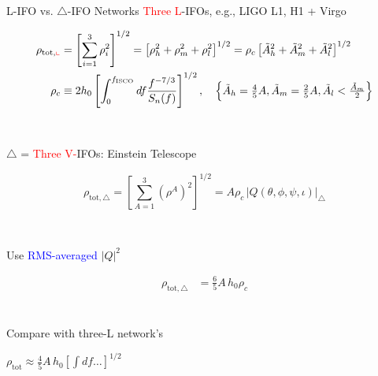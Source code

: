 \documentclass[xcolor=dvipsnames,t]{beamer}
\newcommand{\red}[1]{\textcolor{red}{#1}}
\newcommand{\bl}[1]{\textcolor{blue}{#1}}
\newcommand{\f}{\frac}
\begin{document}
\begin{frame}{L-IFO vs. $\bigtriangleup$-IFO Networks}
\red{Three L}-IFOs, e.g., LIGO L1, H1 + Virgo
%
  \begin{footnotesize} 
  \begin{align*}
  \rho_{\text{tot},\red{\llcorner}} &= \left[{\sum_{i=1}^3 \rho^2_i}\right]^{1/2} =\left[ \rho_h^2 + \rho_m^2 + \rho^2_l \right]^{1/2} 
	  = {\rho_c\left[\tilde{A}_h^2 + \tilde{A}_m^2 + \tilde{A}_l^2 \right]^{1/2}}\\
  \rho_c &\equiv 2 h_0 \left[ \int_0^{{f_\text{ISCO}}} df \f{f^{-7/3}}{S_n(f)}  \right]^{1/2}, \quad \left\{ \tilde{A}_h = \tfrac{4}{5}A,  \tilde{A}_m =\tfrac{2}{5}A,  \tilde{A}_l  < \tfrac{\tilde{A}_m}{2}\right\}
  \end{align*}
  \end{footnotesize}
  \\
  {
    $\bigtriangleup$ = \red{Three V-}IFOs: Einstein Telescope
    \begin{footnotesize} 
    \[
    \rho_{\text{tot},\bigtriangleup} = \left[\sum_{A=1}^3 \left(\rho^A\right)^2\right]^{1/2}  =  A \rho_c \,|Q(\theta,\phi,\psi,\iota)|_\bigtriangleup %
    \]
    \end{footnotesize}
    \\
  }
  Use \bl{RMS-averaged} $|Q|^2$
  \begin{footnotesize}
  \begin{align*}
  \rho_{\text{tot},\bigtriangleup} %
  &=\f{6}{5}A\, h_0 \rho_c \\%
  \end{align*}
  \end{footnotesize}
  \\
  \vspace{-5mm}
  Compare with three-L network's \begin{small}$\rho_\text{tot} \approx \tfrac{4}{5}A\, h_0 \left[ \int df \ldots \right]^{1/2} $ \end{small}
  \vspace{10mm}
\end{frame}
\end{document}
